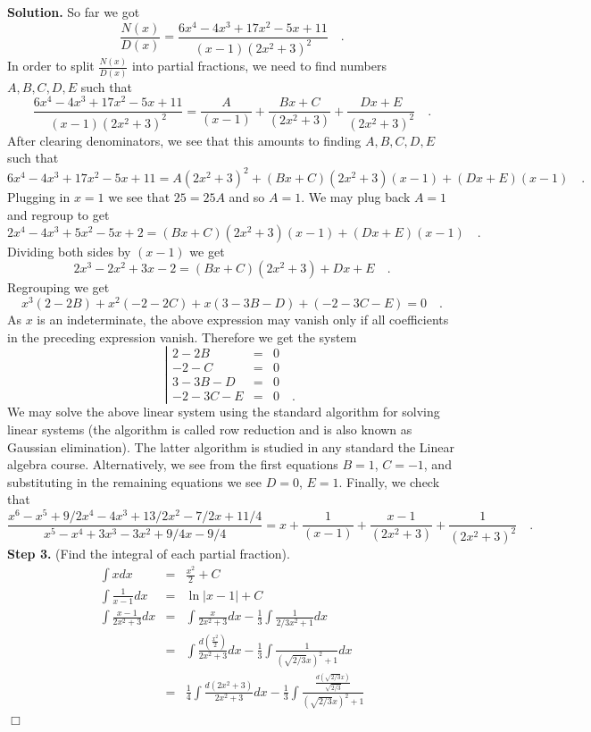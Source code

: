 \documentclass[12pt]{book}
\newenvironment{solution}{\textbf{Solution.} }{$\Box$}
\begin{document}
\begin{solution}
So far we got 
\[
\frac{N(x)}{D(x)}= \frac{6 x^{4}-4 x^{3}+17 x^{2}-5 x+11}{(x-1)(2x^2+3)^2}\quad .
\]
In order to split $\frac{N(x)}{D(x)}$ into partial fractions, we need to find numbers $A, B, C, D, E$ such that 
\[
\frac{6 x^{4}-4 x^{3}+17 x^{2}-5 x+11}{(x-1)(2x^2+3)^2}= \frac{A}{(x-1)}+\frac{Bx+C}{(2x^2+3)}+\frac{Dx+E}{(2x^2+3)^2}\quad .
\]
After clearing denominators, we see that this amounts to finding $A, B, C, D, E$ such that
\[
6 x^{4}-4 x^{3}+17 x^{2}-5 x+11= A(2x^2+3)^2+ (Bx+C)(2x^2+3)(x-1) + (Dx+E)(x-1)\quad .  
\]
Plugging in $x=1$ we see that $25=25A $ and so $A=1$. We may plug back $A=1$ and regroup to get
\[
2x^{4}-4x^{3}+5x^{2}-5x+2= (Bx+C)(2x^2+3)(x-1) + (Dx+E)(x-1)\quad .
\]
Dividing both sides by $(x-1)$ we get 
\[
2x^{3}-2x^{2}+3x-2= (Bx+C)(2x^2+3)+Dx+E\quad .
\]
Regrouping we get 
\[
x^{3}(2- 2B) + x^2(-2-2C)+x(3-3B-D)+(-2-3C-E)=0\quad.
\]
As $x$ is an indeterminate, the above expression may vanish only if all coefficients in the preceding expression vanish. Therefore we get the system
\[
\left| \begin{array}{rcl}
2-2B&=&0\\
-2-C&=&0\\
3-3B-D&=&0\\
-2-3C-E&=&0\quad .
\end{array}   \right.
\]
We may solve the above linear system using the standard algorithm for solving linear systems (the algorithm is called row reduction and is also known as Gaussian elimination). The latter algorithm is studied in any standard the Linear algebra course. Alternatively, we see from the first equations $B=1$, $C=-1$, and substituting in the remaining equations we see $D=0$, $E=1$. Finally, we check that 
\[
\frac{x^{6}-x^{5}+9/2x^{4}-4x^{3}+13/2x^{2}-7/2x+11/4}{x^{5}-x^{4}+3x^{3}-3x^{2}+9/4x-9/4}=x+\frac{1}{(x-1)}+\frac{x-1}{(2x^2+3)}+\frac{1}{(2x^2+3)^2}\quad .
\]
\textbf{Step 3.} (Find the integral of each partial fraction). 
\[
\begin{array}{rcl}
\displaystyle\int x dx &= &\frac{x ^2}2+C\\
\displaystyle\int \frac{1}{x-1} dx &=& \ln|x-1|+C\\
\displaystyle\int \frac{x-1}{2x^2+3} dx &=& \displaystyle \int\frac{x}{2x^2+3}dx -\frac{1}{3}\int \frac{1}{2/3x^2+1}dx\\
&=& \displaystyle  \int \frac{d(\frac{x^2}2)}{2x^2+3}dx-\frac{1}{3} \int \frac{1}{\left(\sqrt{2/3}x\right)^2+1} d x\\
&=&\frac{1}{4} \int \frac{d(2x^2+3)}{2x^2+3}dx- \frac{1}{3}\int \frac{\frac{d (\sqrt{2/3}x)} {\sqrt{2/3}}} {\left( \sqrt{2/3}x\right)^2+1} \\

\end{array}\]
\end{solution}
\end{document}
